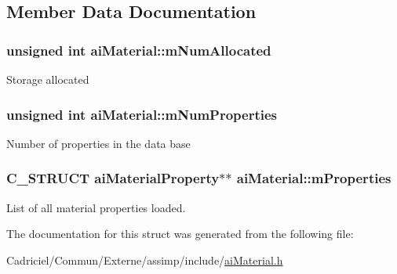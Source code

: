 \subsection{Member Data Documentation}
\hypertarget{structai_material_a84a0016a263362c52b27a9d8d76dc449}{
\subsubsection[{m\-Num\-Allocated}]{\setlength{\rightskip}{0pt plus 5cm}unsigned int ai\-Material\-::m\-Num\-Allocated}}\label{structai_material_a84a0016a263362c52b27a9d8d76dc449}
Storage allocated \hypertarget{structai_material_a243b07afdc6507f8878c93a2cafe4963}{
\subsubsection[{m\-Num\-Properties}]{\setlength{\rightskip}{0pt plus 5cm}unsigned int ai\-Material\-::m\-Num\-Properties}}\label{structai_material_a243b07afdc6507f8878c93a2cafe4963}
Number of properties in the data base \hypertarget{structai_material_af32b125d54bff5bc1fc54a1007487cab}{
\subsubsection[{m\-Properties}]{\setlength{\rightskip}{0pt plus 5cm}C\-\_\-\-S\-T\-R\-U\-C\-T ai\-Material\-Property$\ast$$\ast$ ai\-Material\-::m\-Properties}}\label{structai_material_af32b125d54bff5bc1fc54a1007487cab}
List of all material properties loaded. 

The documentation for this struct was generated from the following file\-:\begin{DoxyCompactItemize}
\item 
Cadriciel/\-Commun/\-Externe/assimp/include/\hyperlink{ai_material_8h}{ai\-Material.\-h}\end{DoxyCompactItemize}
